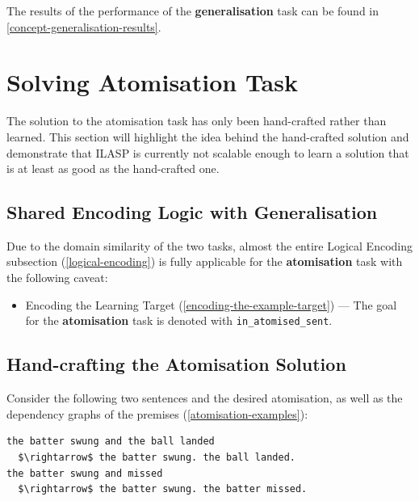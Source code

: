 The results of the performance of the \textbf{generalisation} task can be found in \ref{concept-generalisation-results}.

\section{Solving Atomisation Task}

The solution to the atomisation task has only been hand-crafted rather than learned.
This section will highlight the idea behind the hand-crafted solution and demonstrate that ILASP is currently not scalable enough to learn a solution that is at least as good as the hand-crafted one.

\subsection{Shared Encoding Logic with Generalisation}

Due to the domain similarity of the two tasks, almost the entire Logical Encoding subsection (\ref{logical-encoding}) is fully applicable for the \textbf{atomisation} task with the following caveat:
\begin{itemize}
    \item Encoding the Learning Target (\ref{encoding-the-example-target}) --- The goal for the \textbf{atomisation} task is denoted with \verb+in_atomised_sent+.
\end{itemize}

\subsection{Hand-crafting the Atomisation Solution}
\label{hand-crafting-the-atomisation-solution}

Consider the following two sentences and the desired atomisation, as well as the dependency graphs of the premises (\ref{atomisation-examples}):
\begin{lstlisting}
the batter swung and the ball landed 
  $\rightarrow$ the batter swung. the ball landed.
the batter swung and missed 
  $\rightarrow$ the batter swung. the batter missed.
\end{lstlisting}

